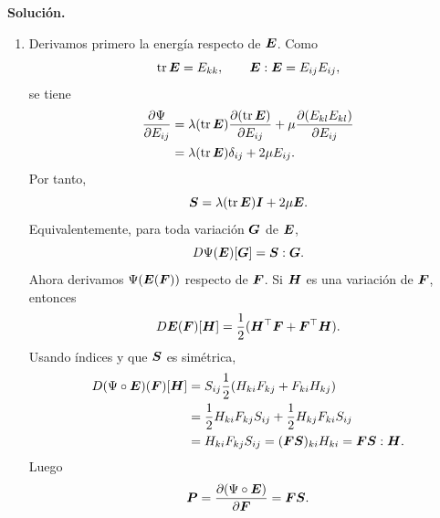 \documentclass[11pt]{article}
\def\ten   #1{\mbox{\boldmath $#1$}{}}
\DeclareMathOperator{\tr}{tr}
\begin{document}
\begin{enumerate}[label=\textbf{\arabic*.}, leftmargin=*]
    \textbf{Solución.}
    \begin{enumerate}[label=(\alph*)]
        \item Derivamos primero la energía respecto de $\ten E$. Como
        \[
            \tr\ten E=E_{kk},
            \qquad
            \ten E:\ten E=E_{ij}E_{ij},
        \]
        se tiene
        \[
        \begin{aligned}
            \frac{\partial\Psi}{\partial E_{ij}}
            &=
            \lambda(\tr\ten E)\frac{\partial(\tr\ten E)}{\partial E_{ij}}
            +\mu\frac{\partial(E_{kl}E_{kl})}{\partial E_{ij}}\\
            &=
            \lambda(\tr\ten E)\delta_{ij}
            +2\mu E_{ij}.
        \end{aligned}
        \]
        Por tanto,
        \[
            \ten S=\lambda(\tr\ten E)\ten I+2\mu\ten E.
        \]
        Equivalentemente, para toda variación $\ten G$ de $\ten E$,
        \[
            D\Psi(\ten E)[\ten G]
            =
            \ten S:\ten G.
        \]
        Ahora derivamos $\Psi(\ten E(\ten F))$ respecto de $\ten F$. Si $\ten H$ es una variación de $\ten F$, entonces
        \[
            D\ten E(\ten F)[\ten H]
            =
            \frac12(\ten H^\top\ten F+\ten F^\top\ten H).
        \]
        Usando índices y que $\ten S$ es simétrica,
        \[
        \begin{aligned}
            D(\Psi\circ \ten E)(\ten F)[\ten H]
            &=
            S_{ij}\frac12(H_{ki}F_{kj}+F_{ki}H_{kj})\\
            &=
            \frac12H_{ki}F_{kj}S_{ij}
            +\frac12H_{kj}F_{ki}S_{ij}\\
            &=
            H_{ki}F_{kj}S_{ij}
            =
            (\ten F\ten S)_{ki}H_{ki}
            =
            \ten F\ten S:\ten H.
        \end{aligned}
        \]
        Luego
        \[
            \ten P=\frac{\partial(\Psi\circ\ten E)}{\partial\ten F}=\ten F\ten S.
        \]


\end{enumerate}
\end{enumerate}
\end{document}
